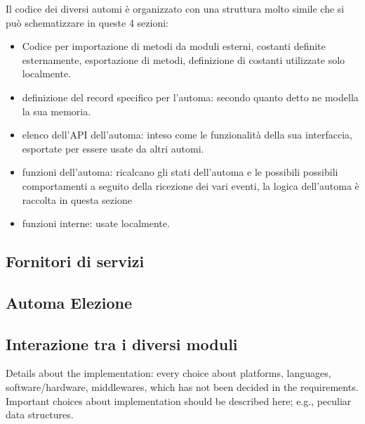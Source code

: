 Il codice dei diversi automi è organizzato con una struttura molto simile che si può schematizzare in queste 4 sezioni:

\begin{itemize}
	\item Codice per importazione di metodi da moduli esterni, costanti definite esternamente, esportazione di metodi, definizione di costanti utilizzate solo localmente.
	\item definizione del record specifico per l'automa: secondo quanto detto ne modella la sua memoria.
	\item elenco dell'API dell'automa: inteso come le funzionalità della sua interfaccia, esportate per essere usate da altri automi.
	\item funzioni dell'automa: ricalcano gli stati dell'automa e le possibili possibili comportamenti a seguito della ricezione dei vari eventi, la logica dell'automa è raccolta in questa sezione
	\item funzioni interne: usate localmente.
\end{itemize}



\subsection{Fornitori di servizi}

\subsection{Automa Elezione}

\subsection{Interazione tra i diversi moduli}


Details about the implementation: every choice about platforms, languages, software/hardware, middlewares, which has not been decided in the requirements.
Important choices about implementation should be described here; e.g., peculiar data structures.